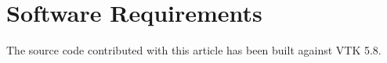 \documentclass{InsightArticle}
\begin{document}
\section{Software Requirements}

The source code contributed with this article has been built against VTK 5.8.

%
%




%
%



\end{document}
